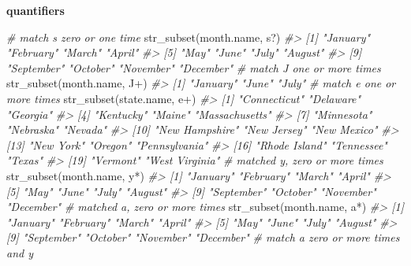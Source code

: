 \documentclass[
]{book}
\newenvironment{Shaded}{\begin{snugshade}}{\end{snugshade}}
\newcommand{\CommentTok}[1]{\textcolor[rgb]{0.56,0.35,0.01}{\textit{#1}}}
\newcommand{\FunctionTok}[1]{\textcolor[rgb]{0.00,0.00,0.00}{#1}}
\newcommand{\NormalTok}[1]{#1}
\newcommand{\StringTok}[1]{\textcolor[rgb]{0.31,0.60,0.02}{#1}}
\begin{document}
\textbf{quantifiers}

\begin{Shaded}
\begin{Highlighting}[]
\CommentTok{\# match \textquotesingle{}s\textquotesingle{} zero or one time}
\FunctionTok{str\_subset}\NormalTok{(month.name, }\StringTok{\textquotesingle{}s?\textquotesingle{}}\NormalTok{)}
\CommentTok{\#\textgreater{}  [1] "January"   "February"  "March"     "April"    }
\CommentTok{\#\textgreater{}  [5] "May"       "June"      "July"      "August"   }
\CommentTok{\#\textgreater{}  [9] "September" "October"   "November"  "December"}
\CommentTok{\# match \textquotesingle{}J\textquotesingle{} one or more times}
\FunctionTok{str\_subset}\NormalTok{(month.name, }\StringTok{\textquotesingle{}J+\textquotesingle{}}\NormalTok{)}
\CommentTok{\#\textgreater{} [1] "January" "June"    "July"}
\CommentTok{\# match \textquotesingle{}e\textquotesingle{} one or more times}
\FunctionTok{str\_subset}\NormalTok{(state.name, }\StringTok{\textquotesingle{}e+\textquotesingle{}}\NormalTok{)}
\CommentTok{\#\textgreater{}  [1] "Connecticut"   "Delaware"      "Georgia"      }
\CommentTok{\#\textgreater{}  [4] "Kentucky"      "Maine"         "Massachusetts"}
\CommentTok{\#\textgreater{}  [7] "Minnesota"     "Nebraska"      "Nevada"       }
\CommentTok{\#\textgreater{} [10] "New Hampshire" "New Jersey"    "New Mexico"   }
\CommentTok{\#\textgreater{} [13] "New York"      "Oregon"        "Pennsylvania" }
\CommentTok{\#\textgreater{} [16] "Rhode Island"  "Tennessee"     "Texas"        }
\CommentTok{\#\textgreater{} [19] "Vermont"       "West Virginia"}
\CommentTok{\# matched \textquotesingle{}y\textquotesingle{}, zero or more times}
\FunctionTok{str\_subset}\NormalTok{(month.name, }\StringTok{\textquotesingle{}y*\textquotesingle{}}\NormalTok{)}
\CommentTok{\#\textgreater{}  [1] "January"   "February"  "March"     "April"    }
\CommentTok{\#\textgreater{}  [5] "May"       "June"      "July"      "August"   }
\CommentTok{\#\textgreater{}  [9] "September" "October"   "November"  "December"}
\CommentTok{\# matched \textquotesingle{}a\textquotesingle{}, zero or more times}
\FunctionTok{str\_subset}\NormalTok{(month.name, }\StringTok{\textquotesingle{}a*\textquotesingle{}}\NormalTok{)}
\CommentTok{\#\textgreater{}  [1] "January"   "February"  "March"     "April"    }
\CommentTok{\#\textgreater{}  [5] "May"       "June"      "July"      "August"   }
\CommentTok{\#\textgreater{}  [9] "September" "October"   "November"  "December"}
\CommentTok{\# match \textquotesingle{}a\textquotesingle{} zero or more times and \textquotesingle{}y\textquotesingle{}}

\end{Highlighting}
\end{Shaded}
\end{document}
